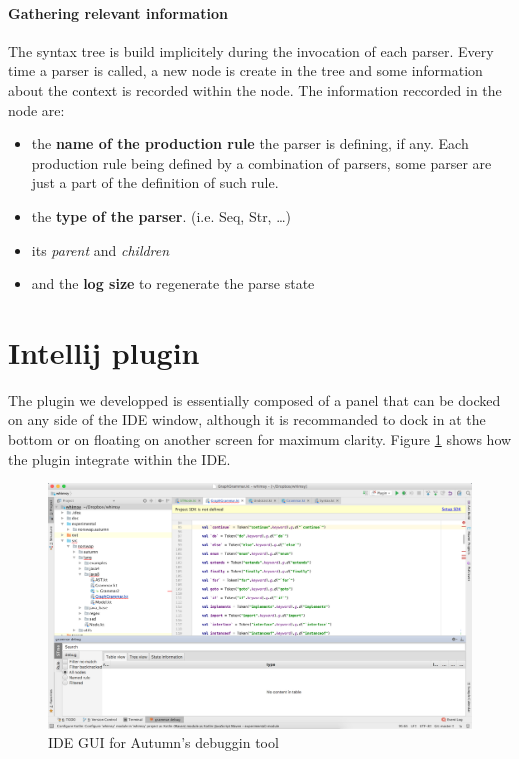 	\paragraph{Gathering relevant information}
	The syntax tree is build implicitely during the invocation of each parser. Every time a parser is called, a new node is create in the tree and some information about the context is recorded within the node. The information reccorded in the node are:
	\begin{itemize}
		\item the \textbf{name of the production rule} the parser is defining, if any. Each production rule being defined by a combination of parsers, some parser are just a part of the definition of such rule.
		\item the \textbf{type of the parser}. (i.e. Seq, Str, \dots)
		\item its \textit{parent} and \textit{children}
		\item and the \textbf{log size} to regenerate the parse state
	\end{itemize}

\section{Intellij plugin}


	The plugin we developped is essentially composed of a panel that can be docked on any side of the IDE window, although it is recommanded to dock in at the bottom or on floating on another screen for maximum clarity. Figure \ref{fig:intj_plug} shows how the plugin integrate within the IDE.

	\begin{figure}[h]
		\includegraphics[width=1\textwidth] {ressources/intj_plug}
		\caption{IDE GUI for Autumn's debuggin tool} 
		\label{fig:intj_plug}
	\end{figure}

